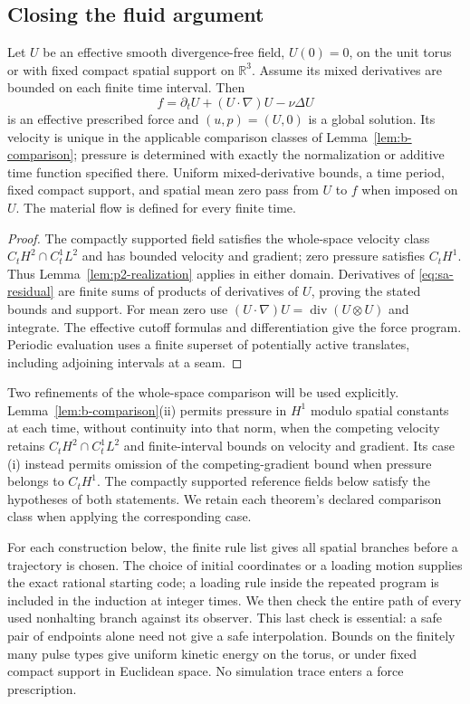 \subsection{Closing the fluid argument}\label{subsec:sa-fluid-assembly}
\begin{lemma}\label{lem:sa-realization}
Let $U$ be an effective smooth divergence-free field, $U(0)=0$, on the
unit torus or with fixed compact spatial support on $\mathbb R^3$.
Assume its mixed derivatives are bounded on each finite time interval.
Then
\begin{equation}\label{eq:sa-residual}
 f=\partial_tU+(U\cdot\nabla)U-\nu\Delta U
\end{equation}
is an effective prescribed force and $(u,p)=(U,0)$ is a global solution.
Its velocity is unique in the applicable comparison classes of
Lemma~\ref{lem:b-comparison}; pressure is determined with exactly the
normalization or additive time function specified there.
Uniform mixed-derivative bounds, a time period, fixed compact support,
and spatial mean zero pass from $U$ to $f$ when imposed on $U$.
The material flow is defined for every finite time.
\end{lemma}
\begin{proof}
The compactly supported field satisfies the whole-space velocity class
$C_tH^2\cap C_t^1L^2$ and has bounded velocity and gradient; zero pressure
satisfies $C_tH^1$.  Thus Lemma~\ref{lem:p2-realization} applies in either
domain.  Derivatives of \eqref{eq:sa-residual} are finite sums of products
of derivatives of $U$, proving the stated bounds and support.  For mean
zero use $(U\cdot\nabla)U=\operatorname{div}(U\otimes U)$ and integrate.
The effective cutoff formulas and differentiation give the force program.
Periodic evaluation uses a finite superset of potentially active translates,
including adjoining intervals at a seam.
\end{proof}

Two refinements of the whole-space comparison will be used explicitly.
Lemma~\ref{lem:b-comparison}(ii) permits pressure in $H^1$ modulo spatial
constants at each time, without continuity into that norm, when the
competing velocity retains $C_tH^2\cap C_t^1L^2$ and finite-interval
bounds on velocity and gradient.  Its case (i) instead permits omission
of the competing-gradient bound when pressure belongs to $C_tH^1$.
The compactly supported reference fields below satisfy the hypotheses
of both statements.  We retain each theorem's declared comparison class
when applying the corresponding case.

For each construction below, the finite rule list gives all spatial
branches before a trajectory is chosen.  The choice of initial coordinates
or a loading motion supplies the exact rational starting code; a loading
rule inside the repeated program is included in the induction at integer
times.  We then check the entire path of every used nonhalting branch
against its observer.  This last check is essential: a safe pair of
endpoints alone need not give a safe interpolation.  Bounds on the
finitely many pulse types give uniform kinetic energy on the torus,
or under fixed compact support in Euclidean space.  No simulation trace
enters a force prescription.
